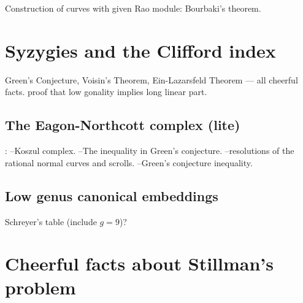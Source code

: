 Construction of curves with given Rao module: Bourbaki's theorem.


\section{Syzygies and the Clifford index}
Green's Conjecture, Voisin's Theorem, Ein-Lazarsfeld Theorem --- all cheerful facts. proof that low gonality implies long linear part.
\subsection{The Eagon-Northcott complex (lite)}: 
--Koszul complex.
--The inequality in Green's conjecture.
--resolutions of the rational normal curves and scrolls.
--Green's conjecture inequality.

\subsection{Low genus canonical embeddings} Schreyer's table (include $g=9$)?

\section{Cheerful facts about Stillman's problem}

